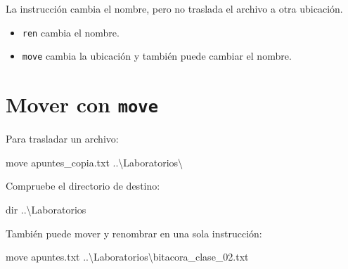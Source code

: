 \documentclass[
  spanish,
  letterpaper,
]{scrbook}
\newenvironment{Shaded}{\begin{snugshade}}{\end{snugshade}}
\newcommand{\BuiltInTok}[1]{\textcolor[rgb]{0.00,0.23,0.31}{#1}}
\newcommand{\NormalTok}[1]{\textcolor[rgb]{0.00,0.23,0.31}{#1}}
\providecommand{\tightlist}{%
  \setlength{\itemsep}{0pt}\setlength{\parskip}{0pt}}
\begin{document}
La instrucción cambia el nombre, pero no traslada el archivo a otra
ubicación.

\begin{tcolorbox}[enhanced jigsaw, arc=.35mm, bottomrule=.15mm, bottomtitle=1mm, breakable, colback=white, colbacktitle=quarto-callout-note-color!10!white, colframe=quarto-callout-note-color-frame, coltitle=black, left=2mm, leftrule=.75mm, opacityback=0, opacitybacktitle=0.6, rightrule=.15mm, title=\textcolor{quarto-callout-note-color}{\faInfo}\hspace{0.5em}{Diferencia importante}, titlerule=0mm, toprule=.15mm, toptitle=1mm]

\begin{itemize}
\tightlist
\item
  \texttt{ren} cambia el nombre.
\item
  \texttt{move} cambia la ubicación y también puede cambiar el nombre.
\end{itemize}

\end{tcolorbox}


\chapter{\texorpdfstring{Mover con
\texttt{move}}{Mover con move}}\label{mover-con-move}

Para trasladar un archivo:

\begin{Shaded}
\begin{Highlighting}[]
\BuiltInTok{move}\NormalTok{ apuntes\_copia.txt ..\textbackslash{}Laboratorios\textbackslash{}}
\end{Highlighting}
\end{Shaded}

Compruebe el directorio de destino:

\begin{Shaded}
\begin{Highlighting}[]
\BuiltInTok{dir}\NormalTok{ ..\textbackslash{}Laboratorios}
\end{Highlighting}
\end{Shaded}

También puede mover y renombrar en una sola instrucción:

\begin{Shaded}
\begin{Highlighting}[]
\BuiltInTok{move}\NormalTok{ apuntes.txt ..\textbackslash{}Laboratorios\textbackslash{}bitacora\_clase\_02.txt}
\end{Highlighting}
\end{Shaded}
\end{document}
